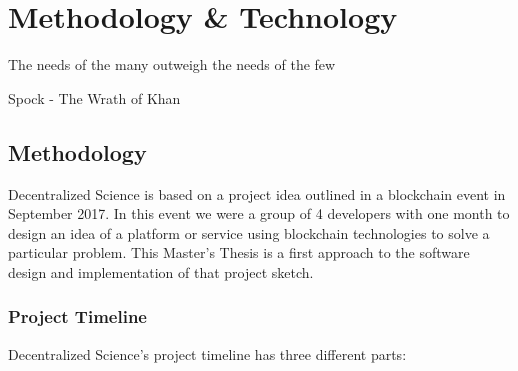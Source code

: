 \chapter{Methodology \& Technology}

\begin{FraseCelebre}
  \begin{Frase}
    The needs of the many outweigh the needs of the few
  \end{Frase}
  \begin{Fuente}
    Spock - The Wrath of Khan
  \end{Fuente}
\end{FraseCelebre}

\section{Methodology}

Decentralized Science is based on a project idea outlined in a blockchain event
in September 2017. In this event we were a group of 4 developers with one month
to design an idea of a platform or service using blockchain technologies to
solve a particular problem. This Master's Thesis is a first approach to the
software design and implementation of that project sketch.

\subsection{Project Timeline}
\label{methodology:timeline}


Decentralized Science's project timeline has three different parts:

